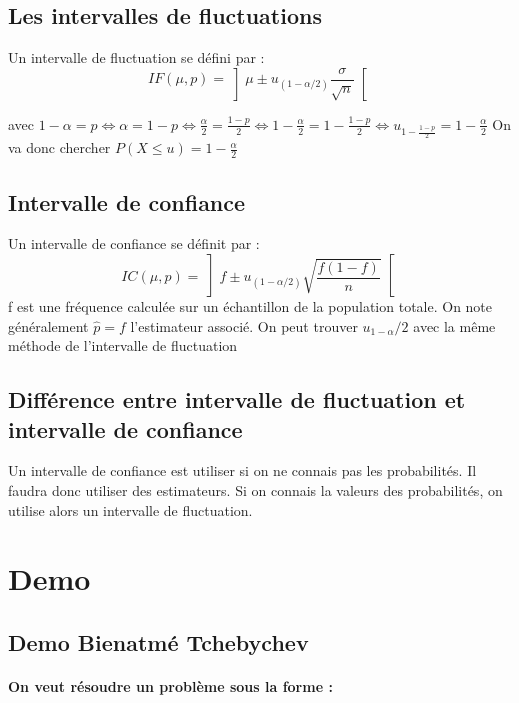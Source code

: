 \documentclass{article}
\begin{document}
\subsection{Les intervalles de fluctuations}
Un intervalle de fluctuation se défini par : \begin{equation*}
    IF(\mu,p) = \left ] \mu \pm u_{(1-\alpha/2)} \frac{\sigma}{\sqrt{n}} \right [
\end{equation*}
\begin{center}
\label{eq:Calcul_alpha}
    avec $1-\alpha = p \iff \alpha = 1-p \iff \frac{\alpha}{2} = \frac{1-p}{2} \iff 1 - \frac{\alpha}{2} = 1 - \frac{1-p}{2} \iff u_{1 - \frac{1-p}{2}} = 1 - \frac{\alpha}{2}$\newline
    On va donc chercher $P(X\leqslant u) = 1 - \frac{\alpha}{2}$
\end{center}

\subsection{Intervalle de confiance}
Un intervalle de confiance se définit par : 
\begin{equation*}
    IC(\mu,p) = \left ] f \pm u_{(1-\alpha/2)} \sqrt{\frac{f(1-f)}{n}} \right [
\end{equation*}
f est une fréquence calculée sur un échantillon de la population totale. On note généralement $\hat{p} = f$ l'estimateur associé.
On peut trouver $u_{1-\alpha}/2$ avec la même méthode de l'intervalle de fluctuation
\subsection{Différence entre intervalle de fluctuation et intervalle de confiance}
Un intervalle de confiance est utiliser si on ne connais pas les probabilités. Il faudra donc utiliser des estimateurs. Si on connais la valeurs des probabilités, on utilise alors un intervalle de fluctuation.

\newpage
\section{Demo}
\subsection{Demo Bienatmé Tchebychev}
\paragraph{On veut résoudre un problème sous la forme : }
\end{document}
